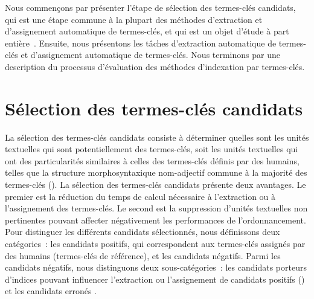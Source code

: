    Nous commençons par présenter l'étape de sélection des termes-clés
    candidats, qui est une étape commune à la plupart des méthodes d'extraction
    et d'assignement automatique de termes-clés, et qui est un objet d'étude à
    part entière~\cite{wang2014keyphraseextractionpreprocessing}. Ensuite, nous
    présentons les tâches d'extraction automatique de termes-clés et
    d'assignement automatique de termes-clés. Nous terminons par une description
    du processus d'évaluation des méthodes d'indexation par termes-clés.


  \section{Sélection des termes-clés candidats}
  \label{sec:main-state_of_the_art-keyphrase_candidate_selection}
    La sélection des termes-clés candidats consiste à déterminer quelles sont
    les unités textuelles qui sont potentiellement des termes-clés, soit les
    unités textuelles qui ont des particularités similaires à celles des
    termes-clés définis par des humains, telles que la structure
    morphosyntaxique nom-adjectif commune à la majorité des termes-clés
    (). La sélection des termes-clés candidats présente deux
    avantages. Le premier est la réduction du temps de calcul nécessaire à
    l'extraction ou à l'assignement des termes-clés. Le second est la
    suppression d'unités textuelles non pertinentes pouvant affecter
    négativement les performances de l'ordonnancement. Pour distinguer les
    différents candidats sélectionnés, nous définissons deux catégories~: les
    candidats positifs, qui correspondent aux termes-clés assignés par des
    humains (termes-clés de référence), et les candidats négatifs. Parmi les
    candidats négatifs, nous distinguons deux sous-catégories~: les candidats
    porteurs d'indices pouvant influencer l'extraction
    ou l'assignement de candidats positifs () et les candidats
    erronés .

